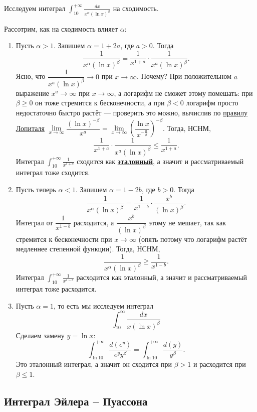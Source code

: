 \begin{example}
	Исследуем интеграл $\displaystyle \int_{10}^{+\infty} \frac{dx}{x^\alpha (\ln x)^\beta}$ на сходимость.
	
	Рассотрим, как на сходимость влияет \(\alpha\):
	\begin{enumerate}
		\item Пусть \(\alpha > 1\). Запишем \(\alpha = 1 + 2a\), где \(a > 0\). Тогда \[
			\frac{1}{x^\alpha (\ln x)^\beta} = \frac{1}{x^{1+a}} \cdot \frac{1}{x^a (\ln x)^\beta}.
		\]
		Ясно, что \(\dfrac{1}{x^a (\ln x)^\beta} \to 0\) при \(x \to \infty\). Почему? При положительном \(a\) выражение \(x^a \to \infty\) при \(x \to \infty\), а логарифм не сможет этому помешать: при \(\beta \geqslant 0\) он тоже стремится к бесконечности, а при \(\beta < 0\) логарифм просто недостаточно быстро растёт --- проверить это можно, вычислив по \hyperlink{t3}{правилу Лопиталя} \(\lim\limits_{x \to \infty} \dfrac{(\ln x)^{-\beta}}{x^a} = \lim\limits_{x \to \infty} \left(\dfrac{\ln x}{x^{-\frac{a}{\beta}}} \right)^{-\beta}\).
		Тогда, НСНМ, \[
			\frac{1}{x^{1 + a}} \cdot \frac{1}{x^a (\ln x)^\beta} \leqslant 	\frac{1}{x^{1 + a}}.
		\]
		Интеграл \(\displaystyle \int_{10}^{+\infty} \frac{1}{x^{1 + a}}\) сходится как \hyperlink{etint}{\bfseries эталонный}, а значит и рассматриваемый интеграл тоже сходится.
		\item Пусть теперь \(\alpha < 1\). Запишем \(\alpha = 1 - 2b\), где \(b > 0\). Тогда \[
			\frac{1}{x^\alpha (\ln x)^\beta} = \frac{1}{x^{1 - b}} \cdot \frac{x^b}{(\ln x)^\beta}.
		\]
		Интеграл от \(\dfrac{1}{x^{1 - b}}\) расходится, а \(\dfrac{x^b}{(\ln x)^\beta}\) этому не мешает, так как стремится к бесконечности при \(x \to \infty\) (опять потому что логарифм растёт медленнее степенной функции).
		Тогда, НСНМ, \[
			\frac{1}{x^\alpha (\ln x)^\beta} \geqslant \frac{1}{x^{1 - b}}.
		\]
		Интеграл \(\displaystyle \int_{10}^{+\infty} \frac{1}{x^{1 - b}}\) расходится как эталонный, а значит и рассматриваемый интеграл тоже расходится.
		\item Пусть \(\alpha = 1\), то есть мы исследуем интеграл \[
			\int_{10}^\infty \frac{dx}{x (\ln x)^\beta}
		\]
		Сделаем замену \(y = \ln x\): \[
			\int_{\ln 10}^{+\infty} \frac{d(e^y)}{e^y y^\beta} = \int_{\ln 10}^{+\infty} \frac{d(y)}{y^\beta}.
		\]
		Это эталонный интеграл, а значит он сходится при  \(\beta > 1\) и расходится при  \(\beta \leqslant 1\).
	\end{enumerate}
\end{example}

\subsection{Интеграл Эйлера -- Пуассона}

